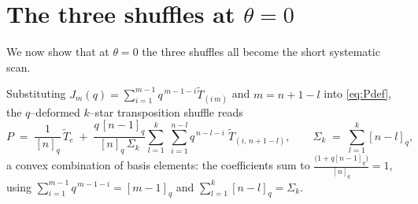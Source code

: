\documentclass[11pt]{article}
\theoremstyle{plain}  %
\newtheorem{definition}[theorem]{Definition}
\begin{document}


\section{The three shuffles at \texorpdfstring{$\theta = 0$}{theta}}\label{sec:theta0}

We now show that at $\theta = 0$ the three shuffles all become the short systematic scan.

Substituting $J_m(q) = \sum_{i=1}^{m-1}q^{\,m-1-i}\widetilde T_{(i\,m)}$ and
$m = n+1-l$ into \eqref{eq:Pdef}, the $q$--deformed $k$--star transposition shuffle reads
\begin{equation}\label{eq:Pbasis}
  P \;=\; \frac{1}{[n]_q}\,\widetilde T_{e}
     \;+\; \frac{q\,[n-1]_q}{[n]_q\,\Sigma_k}
       \sum_{l=1}^{k}\;\sum_{i=1}^{n-l} q^{\,n-l-i}\;
       \widetilde T_{(i,\,n+1-l)},
  \qquad
  \Sigma_k \;=\; \sum_{l=1}^{k}[n-l]_q ,
\end{equation}
a convex combination of basis elements: the coefficients sum to
$\frac{\bigl(1+q[n-1]_q\bigr)}{[n]_q} = 1$, using $\sum_{i=1}^{m-1}q^{\,m-1-i} = [m-1]_q$ and
$\sum_{l=1}^{k}[n-l]_q = \Sigma_k$.

\end{document}
